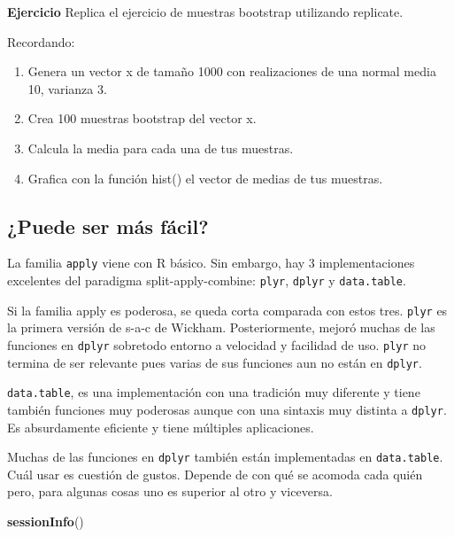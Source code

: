 \documentclass[]{article}
\newenvironment{Shaded}{\begin{snugshade}}{\end{snugshade}}
\newcommand{\KeywordTok}[1]{\textcolor[rgb]{0.13,0.29,0.53}{\textbf{{#1}}}}
\newcommand{\NormalTok}[1]{{#1}}
\begin{document}
\textbf{Ejercicio} Replica el ejercicio de muestras bootstrap utilizando
replicate.

Recordando:

\begin{enumerate}
\item Genera un vector x de tamaño 1000 con realizaciones de una normal media 10, varianza 3. 
\item Crea 100 muestras bootstrap del vector x.
\item Calcula la media para cada una de tus muestras.
\item Grafica con la función hist() el vector de medias de tus muestras.
\end{enumerate}

\subsection{¿Puede ser más fácil?}\label{puede-ser-mas-facil}

La familia \texttt{apply} viene con R básico. Sin embargo, hay 3
implementaciones excelentes del paradigma split-apply-combine:
\texttt{plyr}, \texttt{dplyr} y \texttt{data.table}.

Si la familia apply es poderosa, se queda corta comparada con estos
tres. \texttt{plyr} es la primera versión de s-a-c de Wickham.
Posteriormente, mejoró muchas de las funciones en \texttt{dplyr}
sobretodo entorno a velocidad y facilidad de uso. \texttt{plyr} no
termina de ser relevante pues varias de sus funciones aun no están en
\texttt{dplyr}.

\texttt{data.table}, es una implementación con una tradición muy
diferente y tiene también funciones muy poderosas aunque con una
sintaxis muy distinta a \texttt{dplyr}. Es absurdamente eficiente y
tiene múltiples aplicaciones.

Muchas de las funciones en \texttt{dplyr} también están implementadas en
\texttt{data.table}. Cuál usar es cuestión de gustos. Depende de con qué
se acomoda cada quién pero, para algunas cosas uno es superior al otro y
viceversa.

\printbibliography

\begin{Shaded}
\begin{Highlighting}[]
\KeywordTok{sessionInfo}\NormalTok{()}
\end{Highlighting}
\end{Shaded}
\end{document}
